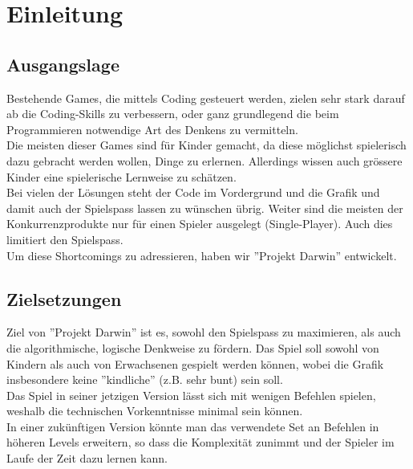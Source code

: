 \documentclass[11pt,a4paper,titlepage]{article}
\begin{document}

\newpage

\section{Einleitung}
\subsection{Ausgangslage}


Bestehende Games, die mittels Coding gesteuert werden, zielen sehr stark darauf ab die Coding-Skills zu verbessern, oder ganz grundlegend die beim Programmieren notwendige Art des Denkens zu vermitteln.\\
Die meisten dieser Games sind für Kinder gemacht, da diese möglichst spielerisch dazu gebracht werden wollen, Dinge zu erlernen. Allerdings wissen auch grössere Kinder eine spielerische Lernweise zu schätzen. \\
Bei vielen der Lösungen steht der Code im Vordergrund und die Grafik und damit auch der Spielspass lassen zu wünschen übrig. 
Weiter sind die meisten der Konkurrenzprodukte nur für einen Spieler ausgelegt (Single-Player). Auch dies limitiert den Spielspass.\\
Um diese Shortcomings zu adressieren, haben wir ''Projekt Darwin'' entwickelt.

\subsection{Zielsetzungen}



Ziel von ''Projekt Darwin'' ist es, sowohl den Spielspass zu maximieren, als auch die algorithmische, logische Denkweise zu fördern. Das Spiel soll sowohl von Kindern als auch von Erwachsenen gespielt werden können, wobei die Grafik insbesondere keine ''kindliche'' (z.B. sehr bunt) sein soll.\\
Das Spiel in seiner jetzigen Version lässt sich mit wenigen Befehlen spielen, weshalb die technischen Vorkenntnisse minimal sein können.\\
In einer zukünftigen Version könnte man das verwendete Set an Befehlen in höheren Levels erweitern, so dass die Komplexität zunimmt und der Spieler im Laufe der Zeit dazu lernen kann.
\end{document}
